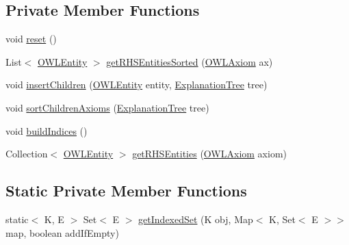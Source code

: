 \subsection*{Private Member Functions}
\begin{DoxyCompactItemize}
\item 
void \hyperlink{classuk_1_1ac_1_1manchester_1_1cs_1_1owl_1_1explanation_1_1ordering_1_1_explanation_orderer_impl_a65449cf9dbff0d86f45dfcc72c409244}{reset} ()
\item 
List$<$ \hyperlink{interfaceorg_1_1semanticweb_1_1owlapi_1_1model_1_1_o_w_l_entity}{O\-W\-L\-Entity} $>$ \hyperlink{classuk_1_1ac_1_1manchester_1_1cs_1_1owl_1_1explanation_1_1ordering_1_1_explanation_orderer_impl_a27e6684b0b2fb16a50dafde170ffaae5}{get\-R\-H\-S\-Entities\-Sorted} (\hyperlink{interfaceorg_1_1semanticweb_1_1owlapi_1_1model_1_1_o_w_l_axiom}{O\-W\-L\-Axiom} ax)
\item 
void \hyperlink{classuk_1_1ac_1_1manchester_1_1cs_1_1owl_1_1explanation_1_1ordering_1_1_explanation_orderer_impl_a56b1472f20c71931db552edff07a7387}{insert\-Children} (\hyperlink{interfaceorg_1_1semanticweb_1_1owlapi_1_1model_1_1_o_w_l_entity}{O\-W\-L\-Entity} entity, \hyperlink{classuk_1_1ac_1_1manchester_1_1cs_1_1owl_1_1explanation_1_1ordering_1_1_explanation_tree}{Explanation\-Tree} tree)
\item 
void \hyperlink{classuk_1_1ac_1_1manchester_1_1cs_1_1owl_1_1explanation_1_1ordering_1_1_explanation_orderer_impl_a65c792e55d9bacb7de7f8001e585eeda}{sort\-Children\-Axioms} (\hyperlink{classuk_1_1ac_1_1manchester_1_1cs_1_1owl_1_1explanation_1_1ordering_1_1_explanation_tree}{Explanation\-Tree} tree)
\item 
void \hyperlink{classuk_1_1ac_1_1manchester_1_1cs_1_1owl_1_1explanation_1_1ordering_1_1_explanation_orderer_impl_ac72fec2515922ba7afa8faec13dac488}{build\-Indices} ()
\item 
Collection$<$ \hyperlink{interfaceorg_1_1semanticweb_1_1owlapi_1_1model_1_1_o_w_l_entity}{O\-W\-L\-Entity} $>$ \hyperlink{classuk_1_1ac_1_1manchester_1_1cs_1_1owl_1_1explanation_1_1ordering_1_1_explanation_orderer_impl_a95a4f0eb942775c68cb7972586c4fe97}{get\-R\-H\-S\-Entities} (\hyperlink{interfaceorg_1_1semanticweb_1_1owlapi_1_1model_1_1_o_w_l_axiom}{O\-W\-L\-Axiom} axiom)
\end{DoxyCompactItemize}
\subsection*{Static Private Member Functions}
\begin{DoxyCompactItemize}
\item 
static$<$ K, E $>$ Set$<$ E $>$ \hyperlink{classuk_1_1ac_1_1manchester_1_1cs_1_1owl_1_1explanation_1_1ordering_1_1_explanation_orderer_impl_a4b2724a444e40608b123da2d7cb2392b}{get\-Indexed\-Set} (K obj, Map$<$ K, Set$<$ E $>$$>$ map, boolean add\-If\-Empty)
\end{DoxyCompactItemize}

